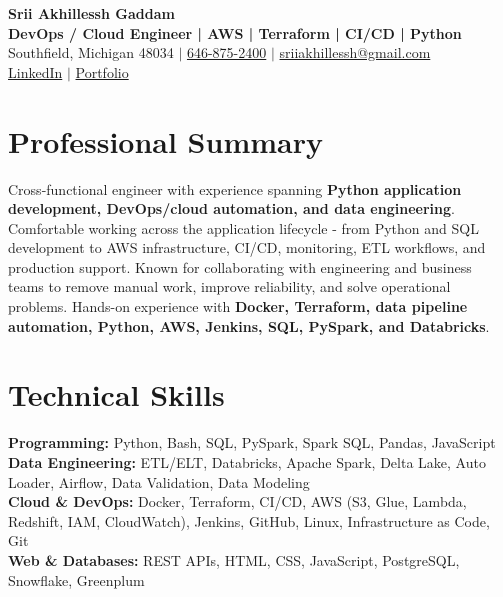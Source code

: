 \documentclass[letterpaper,10pt]{article}
\begin{document}
\fontsize{9.35pt}{10.45pt}\selectfont

\begin{center}
    {\LARGE \textbf{Srii Akhillessh Gaddam}} \\[-1pt]
    \textbf{DevOps / Cloud Engineer | AWS | Terraform | CI/CD | Python} \\[2pt]
    Southfield, Michigan 48034 $|$
    \href{tel:6468752400}{646-875-2400} $|$
    \href{mailto:sriiakhillessh@gmail.com}{sriiakhillessh@gmail.com} \\[1pt]
    \href{https://www.linkedin.com/in/srii-akhiilessh-gaddam-b48668191/}{LinkedIn} $|$
    \href{https://sriiakhillesshg.github.io/portfolio/}{Portfolio}
\end{center}
\vspace{-8pt}

\section{Professional Summary}
\small{Cross-functional engineer with experience spanning \textbf{Python application development, DevOps/cloud automation, and data engineering}. Comfortable working across the application lifecycle - from Python and SQL development to AWS infrastructure, CI/CD, monitoring, ETL workflows, and production support. Known for collaborating with engineering and business teams to remove manual work, improve reliability, and solve operational problems. Hands-on experience with \textbf{Docker, Terraform, data pipeline automation, Python, AWS, Jenkins, SQL, PySpark, and Databricks}.}

\section{Technical Skills}
\small{
\textbf{Programming:} Python, Bash, SQL, PySpark, Spark SQL, Pandas, JavaScript \\
\textbf{Data Engineering:} ETL/ELT, Databricks, Apache Spark, Delta Lake, Auto Loader, Airflow, Data Validation, Data Modeling \\
\textbf{Cloud \& DevOps:} Docker, Terraform, CI/CD, AWS (S3, Glue, Lambda, Redshift, IAM, CloudWatch), Jenkins, GitHub, Linux, Infrastructure as Code, Git \\
\textbf{Web \& Databases:} REST APIs, HTML, CSS, JavaScript, PostgreSQL, Snowflake, Greenplum
}
\end{document}
